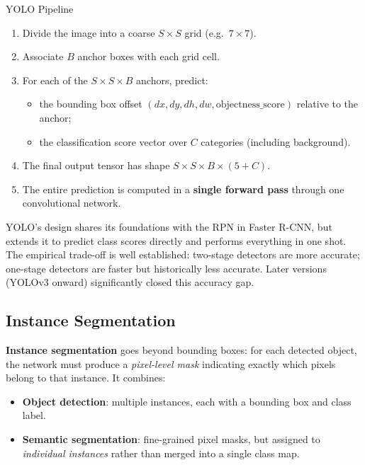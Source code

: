 \documentclass[11pt,a4paper]{article}
\newcommand{\term}[1]{\textcolor{DefGreen}{\textbf{#1}}}
\begin{document}
\begin{thmbox}{YOLO Pipeline}
\begin{enumerate}
  \item Divide the image into a coarse $S \times S$ grid (e.g.\ $7 \times 7$).
  \item Associate $B$ anchor boxes with each grid cell.
  \item For each of the $S \times S \times B$ anchors, predict:
    \begin{itemize}
      \item the bounding box offset $(dx, dy, dh, dw, \text{objectness\_score})$ relative to the anchor;
      \item the classification score vector over $C$ categories (including background).
    \end{itemize}
  \item The final output tensor has shape $S \times S \times B \times (5 + C)$.
  \item The entire prediction is computed in a \textbf{single forward pass} through one convolutional network.
\end{enumerate}
\end{thmbox}

YOLO's design shares its foundations with the RPN in Faster R-CNN, but extends it to predict class scores directly and performs everything in one shot. The empirical trade-off is well established: two-stage detectors are more accurate; one-stage detectors are faster but historically less accurate. Later versions (YOLOv3 onward) significantly closed this accuracy gap.

\subsection{Instance Segmentation}
\label{sec:instance_seg}

\term{Instance segmentation} goes beyond bounding boxes: for each detected object, the network must produce a \emph{pixel-level mask} indicating exactly which pixels belong to that instance. It combines:
\begin{itemize}
  \item \textbf{Object detection}: multiple instances, each with a bounding box and class label.
  \item \textbf{Semantic segmentation}: fine-grained pixel masks, but assigned to \emph{individual instances} rather than merged into a single class map.
\end{itemize}
\end{document}
